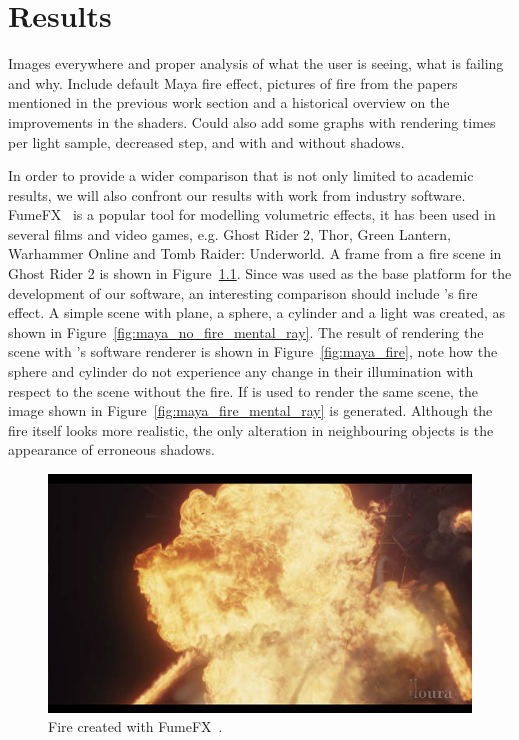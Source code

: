 \chapter{Results}
\label{ch:results}

Images everywhere and proper analysis of what the user is seeing, what is failing and why.
Include default Maya fire effect, pictures of fire from the papers mentioned in the previous work section and a historical overview on the improvements in the shaders.
Could also add some graphs with rendering times per light sample, decreased step, and with and without shadows.

In order to provide a wider comparison that is not only limited to academic results, we will also confront our results with work from industry software.
FumeFX~\cite{FumeFX} is a popular tool for modelling volumetric effects, it has been used in several films and video games, e.g. Ghost Rider 2, Thor, Green Lantern, Warhammer Online and Tomb Raider: Underworld.
A frame from a fire scene in Ghost Rider 2 is shown in Figure~\ref{fig:fumefx}.
Since \Maya was used as the base platform for the development of our software, an interesting comparison should include \Mayash's fire effect.
A simple scene with plane, a sphere, a cylinder and a light was created, as shown in Figure~\ref{fig:maya_no_fire_mental_ray}.
The result of rendering the scene with \Mayash's software renderer is shown in Figure~\ref{fig:maya_fire}, note how the sphere and cylinder do not experience any change in their illumination with respect to the scene without the fire.
If \MentalRay is used to render the same scene, the image shown in Figure~\ref{fig:maya_fire_mental_ray} is generated.
Although the fire itself looks more realistic, the only alteration in neighbouring objects  is the appearance of erroneous shadows.

\begin{figure}[htbp!]
	\centering
	\includegraphics[width=\textwidth]{img/fumefx}
	\caption{Fire created with FumeFX~\cite{FumeFX}.}
	\label{fig:fumefx}
\end{figure}

